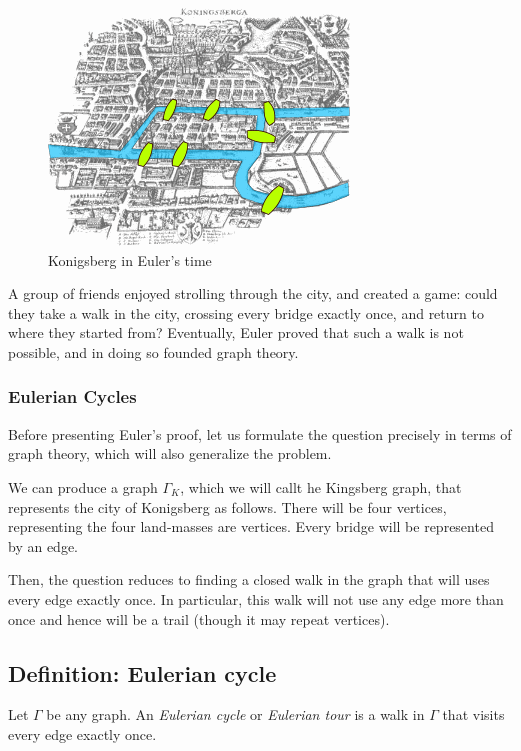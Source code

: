 \documentclass[]{article}
\begin{document}
\begin{figure}[htbp]
\centering
\includegraphics{Konigsberg_bridges.png}
\caption{Konigsberg in Euler's time}
\end{figure}

A group of friends enjoyed strolling through the city, and created a
game: could they take a walk in the city, crossing every bridge exactly
once, and return to where they started from? Eventually, Euler proved
that such a walk is not possible, and in doing so founded graph theory.

\subsubsection{Eulerian Cycles}\label{eulerian-cycles}

Before presenting Euler's proof, let us formulate the question precisely
in terms of graph theory, which will also generalize the problem.

We can produce a graph \(\Gamma_K\), which we will callt he Kingsberg
graph, that represents the city of Konigsberg as follows. There will be
four vertices, representing the four land-masses are vertices. Every
bridge will be represented by an edge.

Then, the question reduces to finding a closed walk in the graph that
will uses every edge exactly once. In particular, this walk will not use
any edge more than once and hence will be a trail (though it may repeat
vertices).

\subsection{Definition: Eulerian cycle}\label{definition-eulerian-cycle}

Let \(\Gamma\) be any graph. An \emph{Eulerian cycle} or \emph{Eulerian
tour} is a walk in \(\Gamma\) that visits every edge exactly once.
\end{document}
